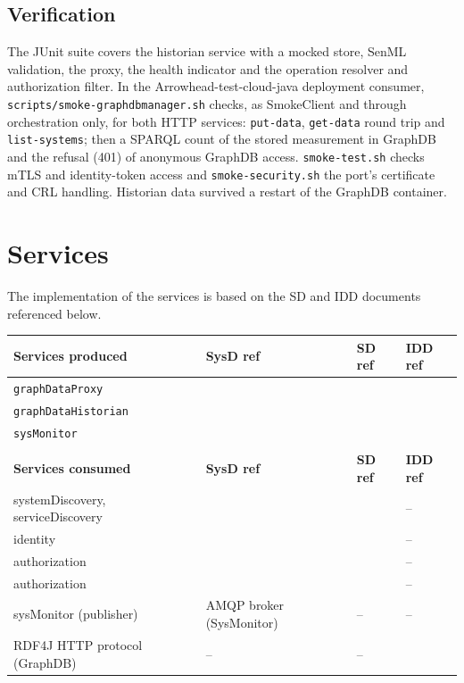 \documentclass[a4paper]{arrowhead}
\begin{document}
\subsection{Verification}

The JUnit suite covers the historian service with a mocked store, SenML validation, the proxy, the health indicator and the operation resolver and authorization filter. In the Arrowhead-test-cloud-java deployment consumer, \texttt{scripts/\allowbreak{}smoke-\allowbreak{}graphdbmanager.sh} checks, as SmokeClient and through orchestration only, for both HTTP services: \texttt{put-\allowbreak{}data}, \texttt{get-\allowbreak{}data} round trip and \texttt{list-\allowbreak{}systems}; then a SPARQL count of the stored measurement in GraphDB and the refusal (401) of anonymous GraphDB access. \texttt{smoke-test.sh} checks mTLS and identity-token access and \texttt{smoke-security.sh} the port's certificate and CRL handling. Historian data survived a restart of the GraphDB container.

\newpage

\section{Services}
\label{sec:services}

The implementation of the services is based on the SD and IDD documents referenced below.

\noindent\begin{longtable}{| p{5.4cm} | p{2.2cm} | p{2.2cm} | p{4.8cm} |} \hline
\rowcolor{gray!33}\textbf{Services produced} & \textbf{SysD ref} & \textbf{SD ref} & \textbf{IDD ref} \\ \hline \endhead
\texttt{graphDataProxy} & \cite{gdm-sysd} & \cite{gdm-graphDataProxy-sd} & \cite{gdm-graphDataProxy-http-idd} \\ \hline
\texttt{graphDataHistorian} & \cite{gdm-sysd} & \cite{gdm-graphDataHistorian-sd} & \cite{gdm-graphDataHistorian-http-idd} \\ \hline
\texttt{sysMonitor} & \cite{gdm-sysd} & \cite{gdm-sysMonitor-sd} & \cite{gdm-sysMonitor-amqp-idd} \\ \hline
&&& \\ \hline
\rowcolor{gray!33}\textbf{Services consumed} & \textbf{SysD ref} & \textbf{SD ref} & \textbf{IDD ref} \\ \hline
systemDiscovery, serviceDiscovery & \cite{core-sr-sysd} & \cite{core-sr-systemDiscovery-sd} & -- \\ \hline
identity & \cite{core-auth-sysd} & \cite{core-auth-identity-sd} & -- \\ \hline
authorization & \cite{core-ca-sysd} & \cite{core-ca-authorization-sd} & -- \\ \hline
authorization & \cite{core-ca-sysd} & \cite{core-ca-authorization-sd} & -- \\ \hline
sysMonitor (publisher) & AMQP broker (SysMonitor) & -- & -- \\ \hline
RDF4J HTTP protocol (GraphDB) & -- & -- & \cite{rdf4j,graphdb} \\ \hline
\end{longtable}
\end{document}

